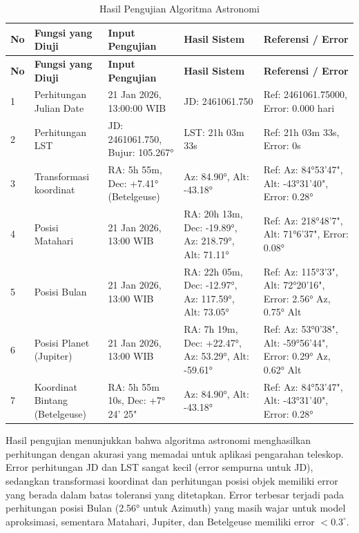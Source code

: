 \begin{longtable}{|p{}|p{}|p{}|p{}|p{}|}
    \caption{Hasil Pengujian Algoritma Astronomi}
    \label{table:4.astronomy_test} \\
    \hline
    \textbf{No} & \textbf{Fungsi yang Diuji} & \textbf{Input Pengujian} & \textbf{Hasil Sistem} & \textbf{Referensi / Error} \\
    \hline
    \endfirsthead
    \hline
    \textbf{No} & \textbf{Fungsi yang Diuji} & \textbf{Input Pengujian} & \textbf{Hasil Sistem} & \textbf{Referensi / Error} \\
    \hline
    \endhead
    \hline
    \endfoot
    \hline
    \endlastfoot

    1 & Perhitungan Julian Date & 21 Jan 2026, 13:00:00 WIB & JD: 2461061.750 & Ref: 2461061.75000, Error: 0.000 hari \\
    \hline
    2 & Perhitungan LST & JD: 2461061.750, Bujur: 105.267° & LST: 21h 03m 33s & Ref: 21h 03m 33s, Error: 0s \\
    \hline
    3 & Transformasi koordinat & RA: 5h 55m, Dec: +7.41° (Betelgeuse) & Az: 84.90°, Alt: -43.18° & Ref: Az: 84°53'47", Alt: -43°31'40", Error: 0.28° \\
    \hline
    4 & Posisi Matahari & 21 Jan 2026, 13:00 WIB & RA: 20h 13m, Dec: -19.89°, Az: 218.79°, Alt: 71.11° & Ref: Az: 218°48'7", Alt: 71°6'37", Error: 0.08° \\
    \hline
    5 & Posisi Bulan & 21 Jan 2026, 13:00 WIB & RA: 22h 05m, Dec: -12.97°, Az: 117.59°, Alt: 73.05° & Ref: Az: 115°3'3", Alt: 72°20'16", Error: 2.56° Az, 0.75° Alt \\
    \hline
    6 & Posisi Planet (Jupiter) & 21 Jan 2026, 13:00 WIB & RA: 7h 19m, Dec: +22.47°, Az: 53.29°, Alt: -59.61° & Ref: Az: 53°0'38", Alt: -59°56'44", Error: 0.29° Az, 0.62° Alt \\
    \hline
    7 & Koordinat Bintang (Betelgeuse) & RA: 5h 55m 10s, Dec: +7° 24' 25" & Az: 84.90°, Alt: -43.18° & Ref: Az: 84°53'47", Alt: -43°31'40", Error: 0.28° \\
    \hline
\end{longtable}

Hasil pengujian menunjukkan bahwa algoritma astronomi menghasilkan perhitungan dengan akurasi yang memadai untuk aplikasi pengarahan teleskop. Error perhitungan JD dan LST sangat kecil (error sempurna untuk JD), sedangkan transformasi koordinat dan perhitungan posisi objek memiliki error yang berada dalam batas toleransi yang ditetapkan. Error terbesar terjadi pada perhitungan posisi Bulan (2.56° untuk Azimuth) yang masih wajar untuk model aproksimasi, sementara Matahari, Jupiter, dan Betelgeuse memiliki error $< 0.3^\circ$. \par

